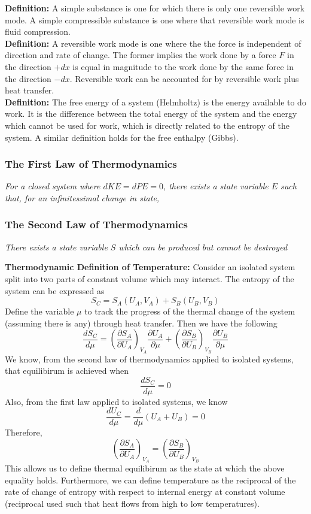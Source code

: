 \documentclass[11pt]{article}
\newcommand{\CenteredBoxed}[1]{\begin{center}\boxed{#1}\end{center}}
\newcommand{\Partial}[2]{\frac{\partial #1}{\partial #2}}
\newcommand{\PartialConst}[3]{\left(\Partial{#1}{#2}\right)_{#3}}
\begin{document}
\textbf{Definition:} A simple substance is one for which there is only one reversible work mode. A simple compressible substance is one where that reversible work mode is fluid compression.\\

\textbf{Definition:} A reversible work mode is one where the the force is independent of direction and rate of change. The former implies the work done by a force $F$ in the direction $+dx$ is equal in magnitude to the work done by the same force in the direction $-dx$. Reversible work can be accounted for by reversible work plus heat transfer.\\

\textbf{Definition:} The free energy of a system (Helmholtz) is the energy available to do work. It is the difference between the total energy of the system and the energy which cannot be used for work, which is directly related to the entropy of the system. A similar definition holds for the free enthalpy (Gibbs).

\subsubsection{The First Law of Thermodynamics}
\large\emph{For a closed system where $dKE=dPE=0$, there exists a state variable $E$ such that, for an infinitessimal change in state,}
\CenteredBoxed{dE=\delta Q + \delta W}
\normalsize

\subsubsection{The Second Law of Thermodynamics}
\large\emph{There exists a state variable $S$ which can be produced but cannot be destroyed}
\CenteredBoxed{S_2-S_1=\Delta S \geq 0}
\normalsize

\textbf{Thermodynamic Definition of Temperature:}
Consider an isolated system split into two parts of constant volume which may interact. The entropy of the system can be expressed as 
$$S_C=S_A(U_A,V_A) + S_B(U_B,V_B)$$
Define the variable $\mu$ to track the progress of the thermal change of the system (assuming there is any) through heat transfer. Then we have the following
$$\frac{dS_C}{d\mu}=\PartialConst{S_A}{U_A}{V_A}\Partial{U_A}{\mu} + \PartialConst{S_B}{U_B}{V_B}\Partial{U_B}{\mu}$$
We know, from the second law of thermodynamics applied to isolated systems, that equilibirum is achieved when
$$\frac{dS_C}{d\mu}=0$$
Also, from the first law applied to isolated systems, we know
$$\frac{dU_C}{d\mu}=\frac{d}{d\mu}(U_A+U_B)=0$$
Therefore,
$$\PartialConst{S_A}{U_A}{V_A}=\PartialConst{S_B}{U_B}{V_B}$$
This allows us to define thermal equilibirum as the state at which the above equality holds. Furthermore, we can define temperature as the reciprocal of the rate of change of entropy with respect to internal energy at constant volume (reciprocal used such that heat flows from high to low temperatures).
\CenteredBoxed{T=\frac{1}{\left(\partial S/\partial U\right)_{V}}}
\end{document}
